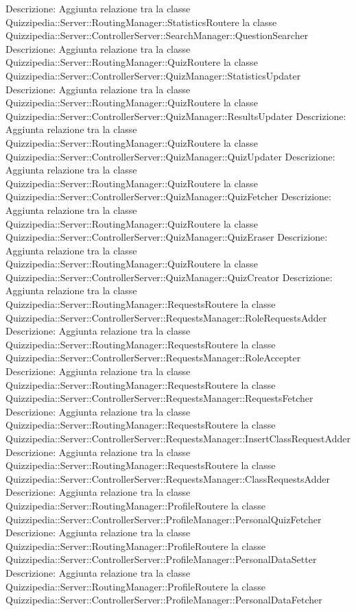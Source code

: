 Descrizione: Aggiunta relazione tra la classe Quizzipedia::Server::RoutingManager::StatisticsRoutere la classe Quizzipedia::Server::ControllerServer::SearchManager::QuestionSearcher 
Descrizione: Aggiunta relazione tra la classe Quizzipedia::Server::RoutingManager::QuizRoutere la classe Quizzipedia::Server::ControllerServer::QuizManager::StatisticsUpdater 
Descrizione: Aggiunta relazione tra la classe Quizzipedia::Server::RoutingManager::QuizRoutere la classe Quizzipedia::Server::ControllerServer::QuizManager::ResultsUpdater 
Descrizione: Aggiunta relazione tra la classe Quizzipedia::Server::RoutingManager::QuizRoutere la classe Quizzipedia::Server::ControllerServer::QuizManager::QuizUpdater 
Descrizione: Aggiunta relazione tra la classe Quizzipedia::Server::RoutingManager::QuizRoutere la classe Quizzipedia::Server::ControllerServer::QuizManager::QuizFetcher 
Descrizione: Aggiunta relazione tra la classe Quizzipedia::Server::RoutingManager::QuizRoutere la classe Quizzipedia::Server::ControllerServer::QuizManager::QuizEraser 
Descrizione: Aggiunta relazione tra la classe Quizzipedia::Server::RoutingManager::QuizRoutere la classe Quizzipedia::Server::ControllerServer::QuizManager::QuizCreator 
Descrizione: Aggiunta relazione tra la classe Quizzipedia::Server::RoutingManager::RequestsRoutere la classe Quizzipedia::Server::ControllerServer::RequestsManager::RoleRequestsAdder 
Descrizione: Aggiunta relazione tra la classe Quizzipedia::Server::RoutingManager::RequestsRoutere la classe Quizzipedia::Server::ControllerServer::RequestsManager::RoleAccepter 
Descrizione: Aggiunta relazione tra la classe Quizzipedia::Server::RoutingManager::RequestsRoutere la classe Quizzipedia::Server::ControllerServer::RequestsManager::RequestsFetcher 
Descrizione: Aggiunta relazione tra la classe Quizzipedia::Server::RoutingManager::RequestsRoutere la classe Quizzipedia::Server::ControllerServer::RequestsManager::InsertClassRequestAdder 
Descrizione: Aggiunta relazione tra la classe Quizzipedia::Server::RoutingManager::RequestsRoutere la classe Quizzipedia::Server::ControllerServer::RequestsManager::ClassRequestsAdder 
Descrizione: Aggiunta relazione tra la classe Quizzipedia::Server::RoutingManager::ProfileRoutere la classe Quizzipedia::Server::ControllerServer::ProfileManager::PersonalQuizFetcher 
Descrizione: Aggiunta relazione tra la classe Quizzipedia::Server::RoutingManager::ProfileRoutere la classe Quizzipedia::Server::ControllerServer::ProfileManager::PersonalDataSetter 
Descrizione: Aggiunta relazione tra la classe Quizzipedia::Server::RoutingManager::ProfileRoutere la classe Quizzipedia::Server::ControllerServer::ProfileManager::PersonalDataFetcher 
